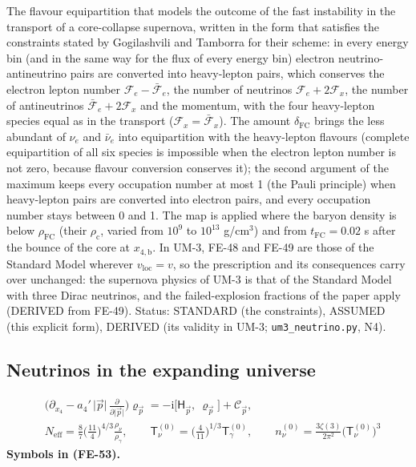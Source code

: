 \documentclass[
  10pt,
]{article}
\begin{document}
The flavour equipartition that models the outcome of the fast
instability in the transport of a core-collapse supernova, written in
the form that satisfies the constraints stated by Gogilashvili and
Tamborra for their scheme: in every energy bin (and in the same way for
the flux of every energy bin) electron neutrino-antineutrino pairs are
converted into heavy-lepton pairs, which conserves the electron lepton
number \(\mathcal{F}_{e} - \bar{\mathcal{F}}_{e}\), the number of
neutrinos \(\mathcal{F}_{e} + 2\mathcal{F}_{x}\), the number of
antineutrinos \(\bar{\mathcal{F}}_{e} + 2\mathcal{F}_{x}\) and the
momentum, with the four heavy-lepton species equal as in the transport
(\(\mathcal{F}_{x} = \bar{\mathcal{F}}_{x}\)). The amount
\(\delta_{\mathrm{FC}}\) brings the less abundant of \(\nu_e\) and
\(\bar\nu_e\) into equipartition with the heavy-lepton flavours
(complete equipartition of all six species is impossible when the
electron lepton number is not zero, because flavour conversion conserves
it); the second argument of the maximum keeps every occupation number at
most 1 (the Pauli principle) when heavy-lepton pairs are converted into
electron pairs, and every occupation number stays between 0 and 1. The
map is applied where the baryon density is below \(\rho_{\mathrm{FC}}\)
(their \(\rho_{\mathrm{c}}\), varied from \(10^9\) to \(10^{13}\)
g/cm\(^3\)) and from \(t_{\mathrm{FC}} = 0.02\) s after the bounce of
the core at \(x_{4,\mathrm{b}}\). In UM-3, FE-48 and FE-49 are those of
the Standard Model wherever \(v_{\mathrm{loc}} = v\), so the
prescription and its consequences carry over unchanged: the supernova
physics of UM-3 is that of the Standard Model with three Dirac
neutrinos, and the failed-explosion fractions of the paper apply
(DERIVED from FE-49). Status: STANDARD (the constraints), ASSUMED (this
explicit form), DERIVED (its validity in UM-3;
\texttt{um3\_neutrino.py}, N4).

\hypertarget{neutrinos-in-the-expanding-universe}{%
\subsection{Neutrinos in the expanding
universe}\label{neutrinos-in-the-expanding-universe}}

\[
\begin{aligned}
&\Big(\partial_{x_4} - a_4'\,\lvert\vec p\rvert\,\frac{\partial}{\partial\lvert\vec p\rvert}\Big)\varrho_{\vec p}
 = -\mathrm{i}\big[\mathsf{H}_{\vec p},\ \varrho_{\vec p}\big] + \mathcal{C}_{\vec p},\\
&N_{\mathrm{eff}} = \frac87\Big(\frac{11}{4}\Big)^{4/3}\frac{\rho_\nu}{\rho_\gamma},\qquad
 \mathsf{T}_\nu^{(0)} = \Big(\frac{4}{11}\Big)^{1/3}\mathsf{T}_\gamma^{(0)},\qquad
 n_\nu^{(0)} = \frac{3\zeta(3)}{2\pi^2}\big(\mathsf{T}_\nu^{(0)}\big)^3
\end{aligned} \tag{FE-53}
\] \textbf{Symbols in (FE-53).}
\end{document}
